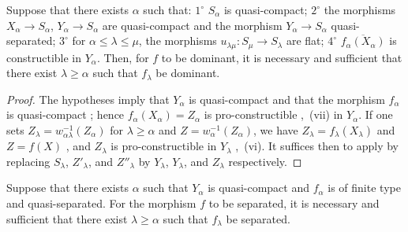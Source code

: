 \begin{proposition}[8.10.3]
\label{IV.8.10.3}
Suppose that there exists $\alpha$ such that: $1^\circ$ $S_\alpha$ is quasi-compact; $2^\circ$ the morphisms $X_\alpha\to S_\alpha$, $Y_\alpha\to S_\alpha$ are quasi-compact and the morphism $Y_\alpha\to S_\alpha$ quasi-separated; $3^\circ$ for $\alpha\leqslant\lambda\leqslant\mu$, the morphisms $u_{\lambda\mu}:S_\mu\to S_\lambda$ are \textup{flat}; $4^\circ$ $\overline{f_\alpha(X_\alpha)}$ is constructible in $Y_\alpha$.
Then, for $f$ to be dominant, it is necessary and sufficient that there exist $\lambda\geqslant\alpha$ such that $f_\lambda$ be dominant.
\end{proposition}

\begin{proof}
The hypotheses imply that $Y_\alpha$ is quasi-compact and that the morphism $f_\alpha$ is quasi-compact ; hence $f_\alpha(X_\alpha)=Z_\alpha$ is pro-constructible ,~(vii) in $Y_\alpha$.
If one sets $Z_\lambda=w_{\alpha\lambda}^{-1}(Z_\alpha)$ for $\lambda\geqslant\alpha$ and $Z=w_\alpha^{-1}(Z_\alpha)$, we have $Z_\lambda=f_\lambda(X_\lambda)$ and $Z=f(X)$ , and $Z_\lambda$ is pro-constructible in $Y_\lambda$ ,~(vi).
It suffices then to apply  by replacing $S_\lambda$, $Z'_\lambda$, and $Z''_\lambda$ by $Y_\lambda$, $Y_\lambda$, and $Z_\lambda$ respectively.
\end{proof}

\begin{proposition}[8.10.4]
\label{IV.8.10.4}
Suppose that there exists $\alpha$ such that $Y_\alpha$ is quasi-compact and $f_\alpha$ is of finite type and quasi-separated.
For the morphism $f$ to be separated, it is necessary and sufficient that there exist $\lambda\geqslant\alpha$ such that $f_\lambda$ be separated.
\end{proposition}

